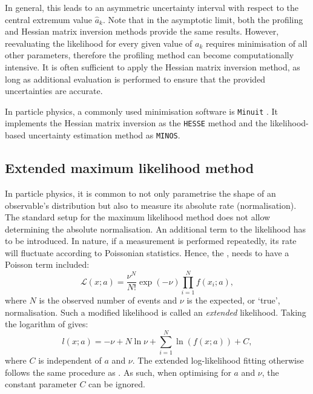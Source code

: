In general, this leads to an asymmetric uncertainty interval with respect to the central extremum value $\hat{a}_k$.
Note that in the asymptotic limit, both the profiling and Hessian matrix inversion methods provide the same results.
However, reevaluating the likelihood for every given value of $a_k$ requires minimisation of all other parameters, 
therefore the profiling method can become computationally intensive. 
It is often sufficient to apply the Hessian matrix inversion method, 
as long as additional evaluation is performed to ensure that the provided uncertainties are accurate.

In particle physics, a commonly used minimisation software is \texttt{Minuit} \cite{James:1975dr,James:2296388}.
It implements the Hessian matrix inversion as the \texttt{HESSE} method and the likelihood-based uncertainty estimation method as \texttt{MINOS}.
\subsection{Extended maximum likelihood method}

In particle physics, it is common to not only parametrise the shape of an observable's distribution but also to measure its absolute rate (normalisation).
The standard setup for the maximum likelihood method does not allow determining the absolute normalisation. 
An additional term to the likelihood has to be introduced.
In nature, if a measurement is performed repeatedly, its rate will fluctuate according to Poissonian statistics.
Hence, the , needs to have a Poisson term included:
\begin{equation}\label{eq:extended_likelihood}
    \mathcal{L}(x;a) = \frac{\nu^N}{N!}\exp(-\nu)\prod_{i=1}^N f(x_i;a),
\end{equation}
where $N$ is the observed number of events and $\nu$ is the expected, or `true', normalisation. 
Such a modified likelihood is called an \textit{extended} likelihood.
Taking the logarithm of  gives:
\begin{equation}\label{eq:extended_log_likelihood}
    l(x;a) = -\nu + N\ln{\nu} + \sum_{i=1}^N \ln (f(x;a)) + C,
\end{equation}
where $C$ is independent of $a$ and $\nu$. 
The extended log-likelihood fitting otherwise follows the same procedure as .
As such, when optimising  for $a$ and $\nu$, the constant parameter $C$ can be ignored.

